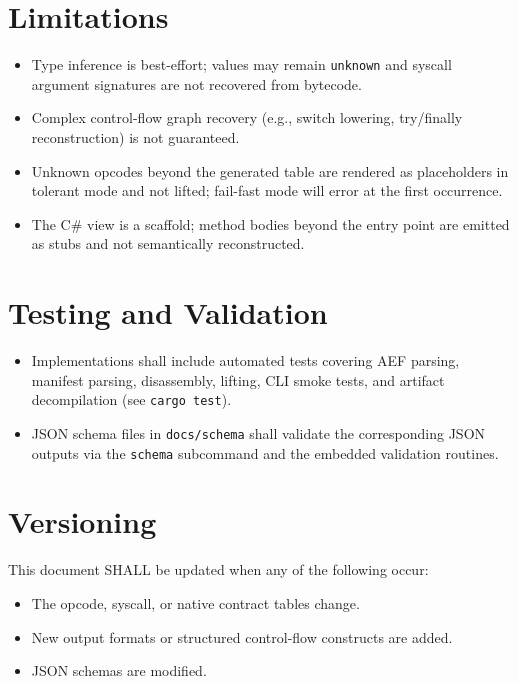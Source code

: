 \documentclass[11pt]{article}
\begin{document}
\section{Limitations}\label{sec:limits}
\begin{itemize}[nosep]
    \item Type inference is best-effort; values may remain \texttt{unknown} and
    syscall argument signatures are not recovered from bytecode.
    \item Complex control-flow graph recovery (e.g., switch lowering, try/finally
    reconstruction) is not guaranteed.
    \item Unknown opcodes beyond the generated table are rendered as
    placeholders in tolerant mode and not lifted; fail-fast mode will error at
    the first occurrence.
    \item The C\# view is a scaffold; method bodies beyond the entry point are
    emitted as stubs and not semantically reconstructed.
\end{itemize}

\section{Testing and Validation}
\begin{itemize}[nosep]
    \item Implementations shall include automated tests covering AEF parsing,
    manifest parsing, disassembly, lifting, CLI smoke tests, and artifact
    decompilation (see \texttt{cargo test}).
    \item JSON schema files in \texttt{docs/schema} shall validate the
    corresponding JSON outputs via the \texttt{schema} subcommand and the
    embedded validation routines.
\end{itemize}

\section{Versioning}
This document SHALL be updated when any of the following occur:
\begin{itemize}[nosep]
    \item The opcode, syscall, or native contract tables change.
    \item New output formats or structured control-flow constructs are added.
    \item JSON schemas are modified.
\end{itemize}
\end{document}
